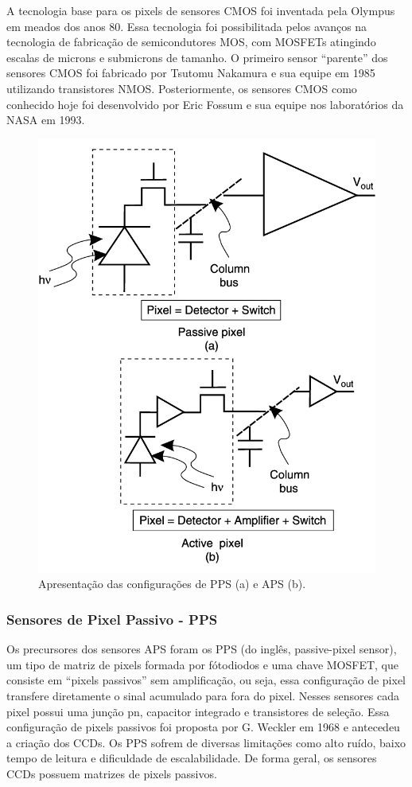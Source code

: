 \documentclass[10pt,a4paper,twocolumn]{article}
\begin{document}
		A tecnologia base para os pixels de sensores CMOS foi inventada pela Olympus em meados dos anos 80. Essa tecnologia foi possibilitada pelos avanços na tecnologia de fabricação de semicondutores MOS, com MOSFETs atingindo escalas de microns e submicrons de tamanho. O primeiro sensor ``parente'' dos sensores CMOS foi fabricado por Tsutomu Nakamura e sua equipe em 1985 utilizando transistores NMOS. Posteriormente, os sensores CMOS como conhecido hoje foi desenvolvido por Eric Fossum e sua equipe nos laboratórios da NASA em 1993.
		
		\begin{figure}[H]
		\centering
		\includegraphics[scale=0.22]{imagens/passive_vs_active.png}
		\caption{Apresentação das configurações de PPS (a) e APS (b).}
		\end{figure}
		
	\subsubsection*{Sensores de Pixel Passivo - PPS} 
		Os precursores dos sensores APS foram os PPS (do inglês, passive-pixel sensor), um tipo de matriz de pixels formada por fótodiodos e uma chave MOSFET, que consiste em ``pixels passivos'' sem amplificação, ou seja, essa configuração de pixel transfere diretamente o sinal acumulado para fora do pixel. Nesses sensores cada pixel possui uma junção pn, capacitor integrado e transistores de seleção. Essa configuração de pixels passivos foi proposta por G. Weckler em 1968 e antecedeu a criação dos CCDs. Os PPS sofrem de diversas limitações como alto ruído, baixo tempo de leitura e dificuldade de escalabilidade. De forma geral, os sensores CCDs possuem matrizes de pixels passivos.
		
\end{document}
